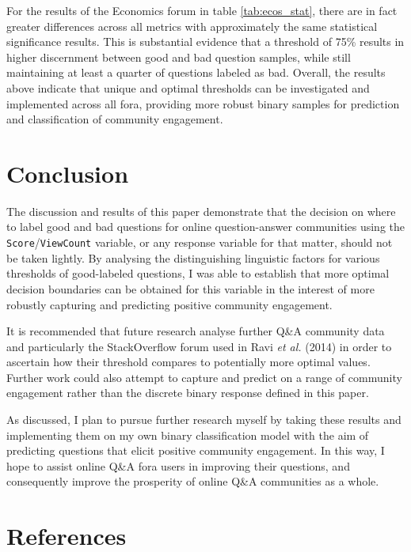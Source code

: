 \documentclass[12pt,preprint, authoryear]{article}
\numberwithin{equation}{section}
\numberwithin{figure}{section}
\numberwithin{table}{section}
\begin{document}
\normalsize

\newpage

For the results of the Economics forum in table \ref{tab:ecos_stat},
there are in fact greater differences across all metrics with
approximately the same statistical significance results. This is
substantial evidence that a threshold of 75\% results in higher
discernment between good and bad question samples, while still
maintaining at least a quarter of questions labeled as bad. Overall, the
results above indicate that unique and optimal thresholds can be
investigated and implemented across all fora, providing more robust
binary samples for prediction and classification of community
engagement.

\section{\texorpdfstring{Conclusion
\label{Concl}}{Conclusion }}\label{conclusion}

The discussion and results of this paper demonstrate that the decision
on where to label good and bad questions for online question-answer
communities using the \texttt{Score}/\texttt{ViewCount} variable, or any
response variable for that matter, should not be taken lightly. By
analysing the distinguishing linguistic factors for various thresholds
of good-labeled questions, I was able to establish that more optimal
decision boundaries can be obtained for this variable in the interest of
more robustly capturing and predicting positive community engagement.

It is recommended that future research analyse further Q\&A community
data and particularly the StackOverflow forum used in Ravi \emph{et al.}
(2014) in order to ascertain how their threshold compares to potentially
more optimal values. Further work could also attempt to capture and
predict on a range of community engagement rather than the discrete
binary response defined in this paper.

As discussed, I plan to pursue further research myself by taking these
results and implementing them on my own binary classification model with
the aim of predicting questions that elicit positive community
engagement. In this way, I hope to assist online Q\&A fora users in
improving their questions, and consequently improve the prosperity of
online Q\&A communities as a whole.

\newpage

\section*{References}\label{references}
\end{document}
